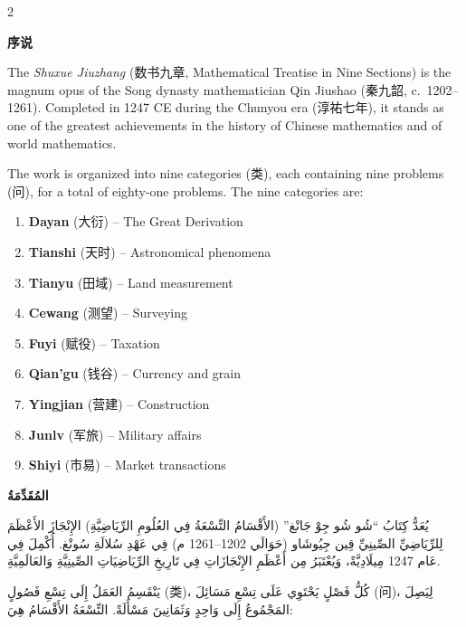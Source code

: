\documentclass[11pt,a4paper]{article}
\newcommand{\ar}[1]{\arabicfont\beginR #1\endR}
\providecommand{\enquote}[1]{``#1''}
\newcommand{\zhtext}[1]{{\chinese #1}}
\newenvironment{bilingual}{%
  \begin{paracol}{2}
}{%
  \end{paracol}
}
\begin{document}
\begin{bilingual}

\begin{leftcolumn*}
\textbf{\zhtext{序说}}

The \textit{Shuxue Jiuzhang} (\zhtext{数书九章}, Mathematical Treatise in Nine Sections) is the magnum opus of the Song dynasty mathematician Qin Jiushao (\zhtext{秦九韶}, c.~1202--1261). Completed in 1247 CE during the Chunyou era (\zhtext{淳祐七年}), it stands as one of the greatest achievements in the history of Chinese mathematics and of world mathematics.

The work is organized into nine categories (\zhtext{类}), each containing nine problems (\zhtext{问}), for a total of eighty-one problems. The nine categories are:

\begin{enumerate}[label=\arabic*.]
  \item \textbf{Dayan} (\zhtext{大衍}) -- The Great Derivation
  \item \textbf{Tianshi} (\zhtext{天时}) -- Astronomical phenomena
  \item \textbf{Tianyu} (\zhtext{田域}) -- Land measurement
  \item \textbf{Cewang} (\zhtext{测望}) -- Surveying
  \item \textbf{Fuyi} (\zhtext{赋役}) -- Taxation
  \item \textbf{Qian'gu} (\zhtext{钱谷}) -- Currency and grain
  \item \textbf{Yingjian} (\zhtext{营建}) -- Construction
  \item \textbf{Junlv} (\zhtext{军旅}) -- Military affairs
  \item \textbf{Shiyi} (\zhtext{市易}) -- Market transactions
\end{enumerate}
\end{leftcolumn*}

\begin{rightcolumn*}
\ar{\textbf{المُقَدِّمَةُ}}

\ar{يُعَدُّ كِتَابُ \enquote{شُو شُو جِوْ جَانْغ} (الأَقْسَامُ التِّسْعَةُ فِي العُلُومِ الرِّيَاضِيَّةِ) الإِنْجَازَ الأَعْظَمَ لِلرِّيَاضِيِّ الصِّينِيِّ قِين جِيُوشَاو (حَوَالَي 1202--1261 م) فِي عَهْدِ سُلالَةِ سُونْغ. أُكْمِلَ فِي عَام 1247 مِيلَادِيَّةً، وَيُعْتَبَرُ مِن أَعْظَمِ الإِنْجَازَاتِ فِي تَارِيخِ الرِّيَاضِيَاتِ الصِّينِيَّةِ وَالعَالَمِيَّةِ.}

\ar{يَنْقَسِمُ العَمَلُ إِلَى تِسْعِ فَصُولٍ (类)، كُلُّ فَصْلٍ يَحْتَوِي عَلَى تِسْعِ مَسَائِلَ (问)، لِيَصِلَ المَجْمُوعُ إِلَى وَاحِدٍ وَثَمَانِينَ مَسْأَلَةً. التِّسْعَةُ الأَقْسَامُ هِيَ:}


\end{rightcolumn*}
\end{bilingual}
\end{document}
